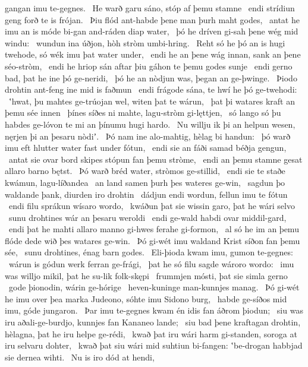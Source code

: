 gangan imu te-gegnes. \hld\ He warð garu sáno,
stóp af þemu stamne \hld\ endi strídiun geng
forð te is frójan. \hld\ Þiu flód ant-habde
þene man þurh maht godes, \hld\ antat he imu an is móde bi-gan
and-ráden diap water, \hld\ þó he dríven gi-sah
þene wég mid windu: \hld\ wundun ina úðjon,
hòh stròm umbi-hring. \hld\ Reht só he þó an is hugi twehode,
só wék imu þat water under, \hld\ endi he an þene wág innan,
sank an þene séo-stròm, \hld\ endi he hriop sán aftar þiu
gáhon te þemu godes sunje \hld\ endi gerno bad,
þat he ine þó ge-neridi, \hld\ þó he an nòdjun was,
þegan an ge-þwinge. \hld\ Þiodo drohtin
ant-feng ine mid is faðmun \hld\ endi frágode sána,
te hwí he þó ge-twehodi: \hld\ ʽhwat, þu mahtes ge-trúojan wel,
witen þat te wárun, \hld\ þat þi watares kraft
an þemu sée innen \hld\ þínes síðes ni mahte,
lagu-stròm gi-lęttjen, \hld\ só lango só þu habdes ge-lóvon te mi
an þínumu hugi hardo. \hld\ Nu willju ik þi an helpun wesen,
nęrjen þi an þesaru nòdiʼ. \hld\ Þó nam ine alo-mahtig,
hèlag bi handun: \hld\ þó warð imu eft hlutter water
fast under fótun, \hld\ endi sie an fáði samad
béðja gengun, \hld\ antat sie ovar bord skipes
stópun fan þemu stròme, \hld\ endi an þemu stamne gesat
allaro barno bętst. \hld\ Þó warð bréd water,
stròmos ge-stillid, \hld\ endi sie te staðe kwámun,
lagu-líðandea \hld\ an land samen
þurh þes wateres ge-win, \hld\ sagdun þo waldande þank,
diurden iro drohtin \hld\ dádjun endi wordun,
fellun imu te fótun \hld\ endi filu sprákun
wísaro wordo, \hld\ kwáðun þat sie wissin garo,
þat he wári selvo \hld\ sunu drohtines
wár an þesaru weroldi \hld\ endi ge-wald habdi
ovar middil-gard, \hld\ endi þat he mahti allaro manno gi-hwes
ferahe gi-formon, \hld\ al só he im an þemu flóde dede
wið þes watares ge-win. \hld\ Þó gi-wét imu waldand Krist
síðon fan þemu sée, \hld\ sunu drohtines,
énag barn godes. \hld\ Eli-þioda kwam imu,
gumon te-gegnes: \hld\ wárun is gódun werk
ferran ge-frági, \hld\ þat he só filu sagde
wároro wordo: \hld\ imu was willjo mikil,
þat he su-lik folk-skępi \hld\ frummjen mósti,
þat sie simla gerno \hld\ gode þionodin,
wárin ge-hórige \hld\ heven-kuninge
man-kunnjes manag. \hld\ Þó gi-wét he imu over þea marka Judeono,
sóhte imu Sidono burg, \hld\ habde ge-síðos mid imu,
góde jungaron. \hld\ Þar imu te-gegnes kwam
én idis fan áðrom þiodun; \hld\ siu was iru aðali-ge-burdjo,
kunnjes fan Kananeo lande; \hld\ siu bad þene kraftagan drohtin,
hèlagna, þat he iru helpe ge-rédi, \hld\ kwað þat iru wári harm gi-standen,
soroga at iru selvaru dohter, \hld\ kwað þat siu wári mid suhtiun bi-fangen:
ʽbe-drogan habbjad sie dernea wihti. \hld\ Nu is iro dód at hendi,
